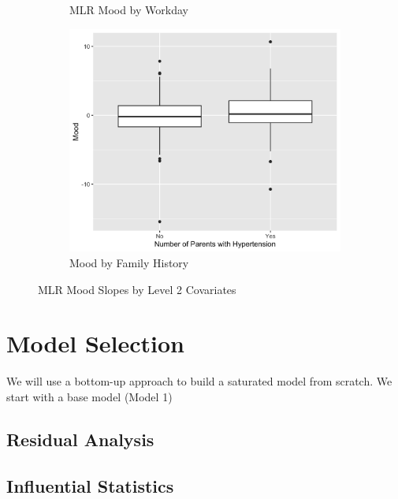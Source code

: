 \documentclass[12pt,twoside,leqno,fleqn,letterpaper]{article}
\theoremstyle{definition}
\theoremstyle{definition}
\begin{document}
\begin{figure}
\begin{subfigure}[b]{0.32\textwidth}
                    \caption[]%
                    {{\small MLR Mood by Workday}}
                    \label{fig: mood v day}
                    \end{subfigure}
                    \hfill
                    \begin{subfigure}[b]{0.32\textwidth}
                    \centering
                    \includegraphics[width=\textwidth]{pics/mlr mood by fh.png}
                    \caption[]%
                    {{\small Mood by Family History}}
                    \label{fig: mood v fh}
                    \end{subfigure}
                    \caption[]
                    {\small MLR Mood Slopes by Level 2 Covariates}
                    \label{fig: mood v lv2}
                    \end{figure}
                

\section{Model Selection}\label{sec: model selection}

We will use a bottom-up approach to build a saturated model from scratch. We start with a base model (Model 1)

\subsection{Residual Analysis}\label{sec: resid}

\subsection{Influential Statistics}\label{sec: infl stat}
\end{document}
